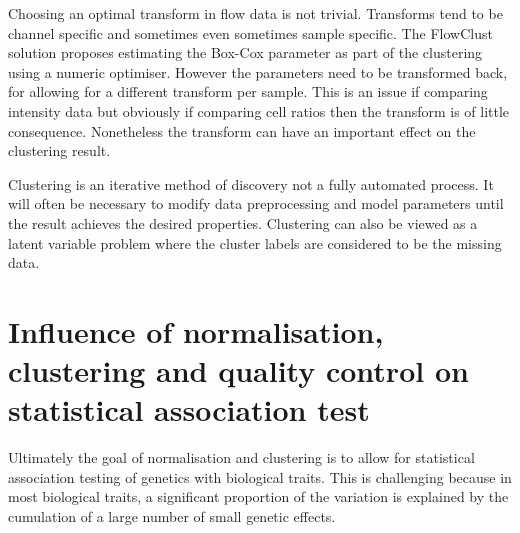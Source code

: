 Choosing an optimal transform in flow data is not trivial.
Transforms tend to be channel specific and sometimes even sometimes sample specific.
The FlowClust solution proposes estimating the Box-Cox parameter as part of the clustering using a numeric optimiser.
However the parameters need to be transformed back, for allowing for a different transform per sample.
This is an issue if comparing intensity data but obviously if comparing cell ratios then the transform is of little consequence.
Nonetheless the transform can have an important effect on the clustering result.

Clustering is an iterative method of discovery not a fully automated process.
It will often be necessary to modify data preprocessing and model parameters until the result achieves the desired properties.  
Clustering can also be viewed as a latent variable problem where the cluster labels are considered to be the missing data.



\section{ Influence of normalisation, clustering and quality control on statistical association test }

Ultimately the goal of normalisation and clustering is to allow for statistical association testing of genetics with biological traits.
This is challenging because in most biological traits, a significant proportion of the variation is explained by the cumulation of a large number of small genetic effects.


